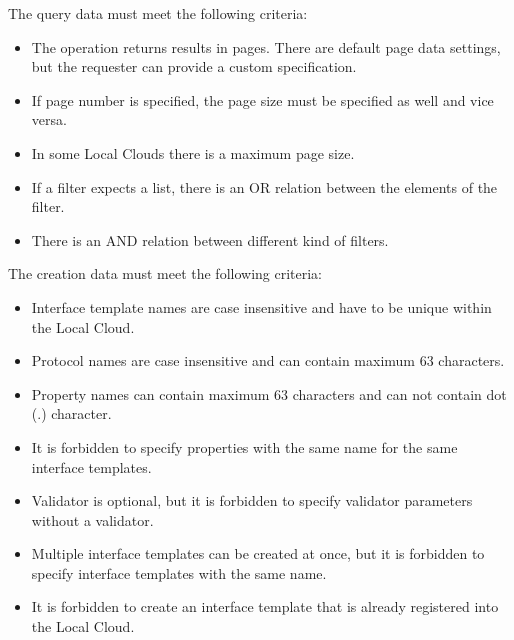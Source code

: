 \documentclass[a4paper]{arrowhead}
\begin{document}


The query data must meet the following criteria:

\begin{itemize}
    \item The operation returns results in pages. There are default page data settings, but the requester can provide a custom specification.
    \item If page number is specified, the page size must be specified as well and vice versa.
    \item In some Local Clouds there is a maximum page size.
    \item If a filter expects a list, there is an OR relation between the elements of the filter.
    \item There is an AND relation between different kind of filters.
\end{itemize} 


The creation data must meet the following criteria:

\begin{itemize}
    \item Interface template names are case insensitive and have to be unique within the Local Cloud.
    \item Protocol names are case insensitive and can contain maximum 63 characters.
    \item Property names can contain maximum 63 characters and can not contain dot (.) character.
    \item It is forbidden to specify properties with the same name  for the same interface templates.
    \item Validator is optional, but it is forbidden to specify validator parameters without a validator.
    \item Multiple interface templates can be created at once, but it is forbidden to specify interface templates with the same name.
    \item It is forbidden to create an interface template that is already registered into the Local Cloud.
\end{itemize}
\end{document}
